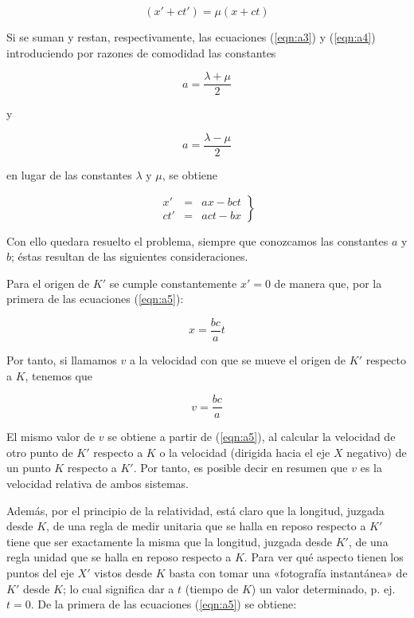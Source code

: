 \documentclass[spanish]{book}
\begin{document}
\begin{equation}
(x'+ct')=\mu(x+ct)\label{eqn:a4}
\end{equation}

Si se suman y restan, respectivamente, las ecuaciones (\ref{eqn:a3}) y (\ref{eqn:a4}) introduciendo por
razones de comodidad las constantes 

\[a=\frac{\lambda+\mu}{2}\]

\noindent y

\[a=\frac{\lambda-\mu}{2}\]

\noindent en lugar de las constantes $\lambda$ y $\mu$, se obtiene

\begin{equation}
\left.\begin{array}{rcl}
x' & = & ax-bct\\
ct' & = & act-bx\end{array}\right\} \label{eqn:a5}
\end{equation}

Con ello quedara resuelto el problema, siempre que conozcamos las constantes $a$
y $b$; éstas resultan de las siguientes consideraciones.

Para el origen de $K'$ se cumple constantemente $x'=0$ de manera que, por la
primera de las ecuaciones (\ref{eqn:a5}):

\[x=\frac{bc}{a}t\]

Por tanto, si llamamos $v$ a la velocidad con que se mueve el origen de $K'$
respecto a $K$, tenemos que

\begin{equation}
v=\frac{bc}{a}\label{eqn:a6}
\end{equation}

El mismo valor de $v$ se obtiene a partir de (\ref{eqn:a5}), al calcular la velocidad de otro
punto de $K'$ respecto a $K$ o la velocidad (dirigida hacia el eje $X$ negativo) de un
punto $K$ respecto a $K'$. Por tanto, es posible decir en resumen que $v$ es la velocidad
relativa de ambos sistemas.

Además, por el principio de la relatividad, está claro que la longitud, juzgada
desde $K$, de una regla de medir unitaria que se halla en reposo respecto a $K'$ tiene
que ser exactamente la misma que la longitud, juzgada desde $K'$, de una regla unidad
que se halla en reposo respecto a $K$. Para ver qué aspecto tienen los puntos del eje
$X'$ vistos desde $K$ basta con tomar una «fotografía instantánea» de $K'$ desde $K$; lo
cual significa dar a $t$ (tiempo de $K$) un valor determinado, p. ej. $t=0$. De la primera
de las ecuaciones (\ref{eqn:a5}) se obtiene:
\end{document}
